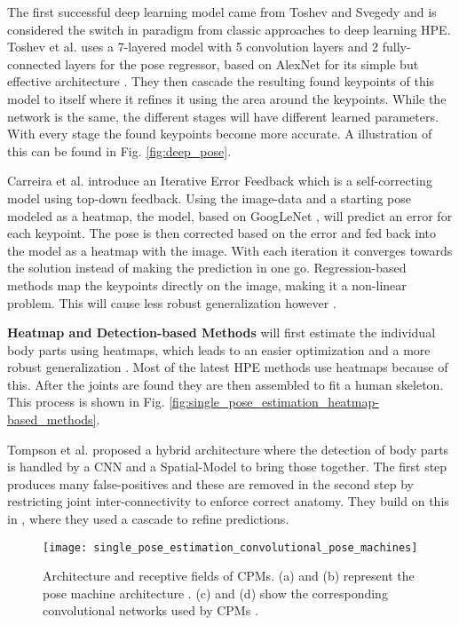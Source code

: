 The first successful deep learning model came from Toshev and Svegedy \cite{Toshev2014} and is considered the switch in paradigm from classic approaches to deep learning \gls{HPE}.
Toshev et al. uses a 7-layered model with 5 convolution layers and 2 fully-connected layers for the pose regressor, based on AlexNet for its simple but effective architecture \cite{AlexNet}.
They then cascade the resulting found keypoints of this model to itself where it refines it using the area around the keypoints.
While the network is the same, the different stages will have different learned parameters.
With every stage the found keypoints become more accurate.
A illustration of this can be found in Fig. \ref{fig:deep_pose}.

Carreira et al. \cite{CarreiraAFM15} introduce an Iterative Error Feedback which is a self-correcting model using top-down feedback.
Using the image-data and a starting pose modeled as a heatmap, the model, based on GoogLeNet \cite{googlenet}, will predict an error for each keypoint.
The pose is then corrected based on the error and fed back into the model as a heatmap with the image.
With each iteration it converges towards the solution instead of making the prediction in one go.
Regression-based methods map the keypoints directly on the image, making it a non-linear problem.
This will cause less robust generalization however \cite{Liu2104}.

\textbf{Heatmap and Detection-based Methods} will first estimate the individual body parts using heatmaps, which leads to an easier optimization and a more robust generalization \cite{chen2022}.
Most of the latest \gls{HPE} methods use heatmaps because of this.
After the joints are found they are then assembled to fit a human skeleton.
This process is shown in Fig. \ref{fig:single_pose_estimation_heatmap-based_methods}.

Tompson et al. \cite{TompsonJLB14} proposed a hybrid architecture where the detection of body parts is handled by a \gls{CNN} and a Spatial-Model to bring those together.
The first step produces many false-positives and these are removed in the second step by restricting joint inter-connectivity to enforce correct anatomy.
They build on this in \cite{Tompson2015}, where they used a cascade to refine predictions.

\begin{figure}
	\centering
	\texttt{[image: single\_pose\_estimation\_convolutional\_pose\_machines]}%
	\caption{
		Architecture and receptive fields of \gls{CPMs}. (a) and (b) represent the pose machine architecture \cite{Ramakrishna2014}.
		(c) and (d) show the corresponding convolutional networks used by \gls{CPMs} \cite{Wei2016}.
	}
	\label{fig:convolutional_pose_machines}
\end{figure}

